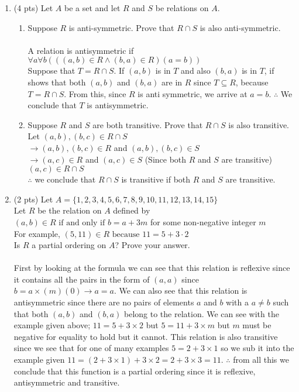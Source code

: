 \documentclass[12pt]{article}
\begin{document}
\begin{enumerate}
\item (4 pts)
Let \(A\) be a set and let \(R\) and \(S\) be relations on \(A\).
\begin{enumerate}
\item  Suppose \(R\) is anti-symmetric. Prove that \(R \cap S\) is also anti-symmetric.\\
\\A relation is antisymmetric if $\forall a \forall b (((a,b) \in R \land (b,a) \in R) (a = b))$
\\Suppose that $T = R \cap S$. If $(a,b)$ is in $T$ and also $(b,a)$ is in $T$, if shows that both $(a,b)$ and $(b,a)$ are in $R$ since $T \subseteq R$, because $T = R\cap S$. From this, since $R$ is anti symmetric, we arrive at $a=b$. $\therefore$ We conclude that $T$ is antisymmetric.
\item Suppose \(R\) and \(S\) are both transitive. Prove that \(R \cap S\) is also transitive.
\\Let $(a,b),(b,c) \in R \cap S$
\\$\rightarrow (a,b),(b,c) \in R$ and $(a,b),(b,c) \in S$
\\$\rightarrow (a,c) \in R $ and $(a,c) \in S$ (Since both $R$ and $S$ are transitive)
\\$(a,c)\in R \cap S$
\\$\therefore$ we conclude that $R \cap S$ is transitive if both $R$ and $S$ are transitive.
\end{enumerate}
\item (2 pts)
Let \(A = \lbrace{1,2,3,4,5,6,7,8,9,10,11,12,13,14,15}\rbrace\) \\
Let \(R\) be the relation on \(A\) defined by\\
\((a,b)\in R \text{ if and only if } b=a+3m\) for some non-negative integer \(m\)
\\
For example, \((5,11)\in R \text{ because } 11=5+3 \cdot 2\)
\\
Is \(R\) a partial ordering on \(A\)? Prove your answer.\\
\\First by looking at the formula we can see that this relation is reflexive since it contains all the pairs in the form of $(a,a)$  since $b = a \times (m)(0) \rightarrow a = a$. We can also see that this relation is antisymmetric since there are no pairs of elements $a$ and $b$ with a $a \neq b$ such that both $(a,b)$ and $(b,a)$ belong to the relation. We can see with the example given above; $11 = 5 + 3\times 2$ but $5 = 11 + 3\times m$ but $m$ must be negative for equality to hold but it cannot. This relation is also transitive since we see that for one of many examples $5 = 2 + 3\times 1$ so we sub it into the example given $11 = (2 + 3 \times 1) + 3 \times 2 = 2 + 3 \times 3 = 11$. $\therefore$ from all this we conclude that this function is a partial ordering since it is reflexive, antisymmetric and transitive.


\end{enumerate}
\end{document}
